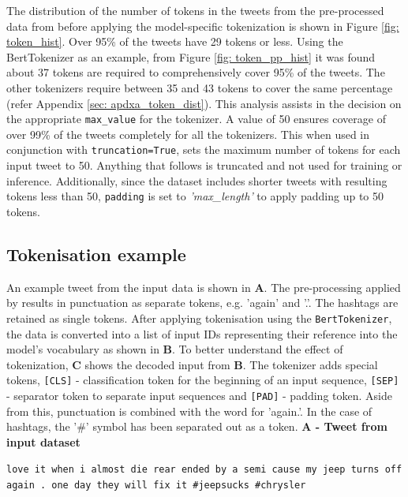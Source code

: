 The distribution of the number of tokens in the tweets from the pre-processed data from \cite{preotiuc-pietro_automatically_2019,jinModelingSeverityComplaints2021} before applying the model-specific tokenization is shown in Figure \ref{fig: token_hist}. Over 95\% of the tweets have 29 tokens or less. Using the BertTokenizer as an example, from Figure \ref{fig: token_pp_hist} it was found about 37 tokens are required to comprehensively cover 95\% of the tweets. The other tokenizers require between 35 and 43 tokens to cover the same percentage (refer Appendix \ref{sec: apdxa_token_dist}). This analysis assists in the decision on the appropriate \texttt{max\_value} for the tokenizer. A value of 50 ensures coverage of over 99\% of the tweets completely for all the tokenizers. This when used in conjunction with \texttt{truncation=True}, sets the maximum number of tokens for each input tweet to 50. Anything that follows is truncated and not used for training or inference. Additionally, since the dataset includes shorter tweets with resulting tokens less than 50, \texttt{padding} is set to \emph{'max\_length'} to apply padding up to 50 tokens.


\subsection{Tokenisation example}
An example tweet from the input data is shown in \textbf{A}. The pre-processing applied by \cite{preotiuc-pietro_automatically_2019,jinModelingSeverityComplaints2021} results in punctuation as separate tokens, e.g. 'again' and '.'. The hashtags are retained as single tokens. After applying tokenisation using the \texttt{BertTokenizer}, the data is converted into a list of input IDs representing their reference into the model's vocabulary as shown in \textbf{B}. To better understand the effect of tokenization, \textbf{C} shows the decoded input from \textbf{B}. The tokenizer adds special tokens, \texttt{[CLS]} - classification token for the beginning of an input sequence, \texttt{[SEP]} - separator token to separate input sequences and \texttt{[PAD]} - padding token. Aside from this, punctuation is combined with the word for 'again.'. In the case of hashtags, the '\#' symbol has been separated out as a token.\newline\newline
\textbf{A - Tweet from input dataset}\newline

\begin{adjustbox}{minipage={\textwidth},fbox}
    \texttt{love it when i almost die rear ended by a semi cause my jeep turns off again 
. one day they will fix it \#jeepsucks \#chrysler}
\end{adjustbox} \newline\newline

